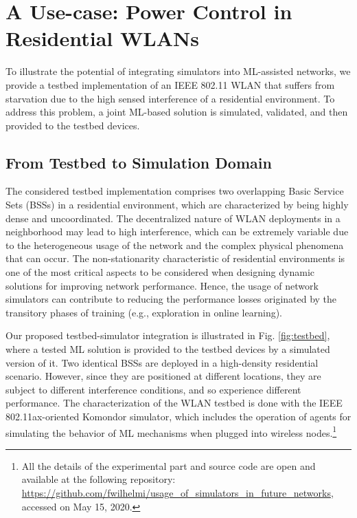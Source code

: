 \documentclass[journal]{IEEEtran}
\begin{document}
	\section{A Use-case: Power Control in Residential WLANs}	
	To illustrate the potential of integrating simulators into ML-assisted networks, we provide a testbed implementation of an IEEE 802.11 WLAN that suffers from starvation due to the high sensed interference of a residential environment. To address this problem, a joint ML-based solution is simulated, validated, and then provided to the testbed devices.
	
	\subsection{From Testbed to Simulation Domain}
	The considered testbed implementation comprises two overlapping Basic Service Sets (BSSs) in a residential environment, which are characterized by being highly dense and uncoordinated. The decentralized nature of WLAN deployments in a neighborhood may lead to high interference, which can be extremely variable due to the heterogeneous usage of the network and the complex physical phenomena that can occur. The non-stationarity characteristic of residential environments is one of the most critical aspects to be considered when designing dynamic solutions for improving network performance. Hence, the usage of network simulators can contribute to reducing the performance losses originated by the transitory phases of training (e.g., exploration in online learning).
	
	Our proposed testbed-simulator integration is illustrated in Fig. \ref{fig:testbed}, where a tested ML solution is provided to the testbed devices by a simulated version of it. Two identical BSSs are deployed in a high-density residential scenario. However, since they are positioned at different locations, they are subject to different interference conditions, and so experience different performance. The characterization of the WLAN testbed is done with the IEEE 802.11ax-oriented Komondor simulator, which includes the operation of agents for simulating the behavior of ML mechanisms when plugged into wireless nodes.\footnote{All the details of the experimental part and source code are open and available at the following repository: \url{https://github.com/fwilhelmi/usage_of_simulators_in_future_networks}, accessed on May 15, 2020.}
	
\end{document}
